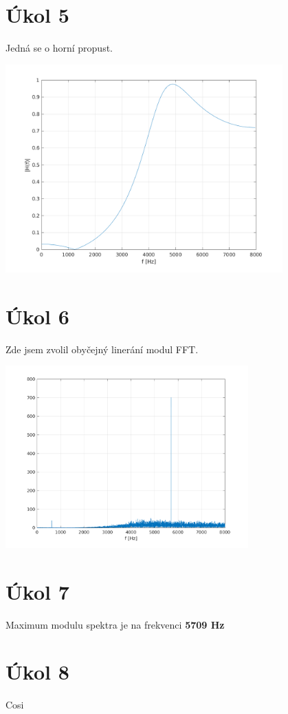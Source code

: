 \documentclass[a4paper, titlepage, final, 10pt]{article}
\begin{document}
\section{Úkol 5}
	Jedná se o horní propust.

	{\centering \includegraphics[height=8cm, keepaspectratio]{Final/task5.png} \par}
\section{Úkol 6}
	Zde jsem zvolil obyčejný linerání modul FFT.

	{\centering \includegraphics[width=\textwidth, height=7cm]{Final/task6.png} \par}
\section{Úkol 7}
	Maximum modulu spektra je na frekvenci \textbf{5709 Hz}
\section{Úkol 8}
	Cosi
\end{document}
